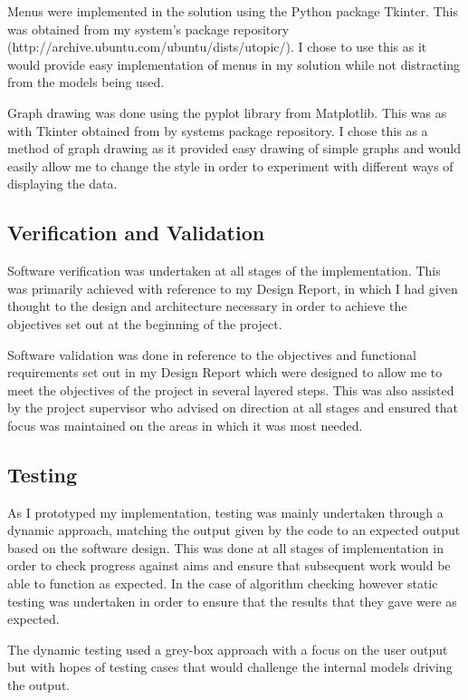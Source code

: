 \documentclass[12pt,a4paper]{article}
\begin{document}
Menus were implemented in the solution using the Python package Tkinter. This was obtained from my system's package repository (http://archive.ubuntu.com/ubuntu/dists/utopic/). I chose to use this as it would provide easy implementation of menus in my solution while not distracting from the models being used.

Graph drawing was done using the pyplot library from Matplotlib. This was as with Tkinter obtained from by systems package repository. I chose this as a method of graph drawing as it provided easy drawing of simple graphs and would easily allow me to change the style in order to experiment with different ways of displaying the data.

\subsection{Verification and Validation}
\noindent
Software verification was undertaken at all stages of the implementation. This was primarily achieved with reference to my Design Report, in which I had given thought to the design and architecture necessary in order to achieve the objectives set out at the beginning of the project.

Software validation was done in reference to the objectives and functional requirements set out in my Design Report which were designed to allow me to meet the objectives of the project in several layered steps. This was also assisted by the project supervisor who advised on direction at all stages and ensured that focus was maintained on the areas in which it was most needed.

\subsection{Testing}
\noindent
As I prototyped my implementation, testing was mainly undertaken through a dynamic approach, matching the output given by the code to an expected output based on the software design. This was done at all stages of implementation in order to check progress against aims and ensure that subsequent work would be able to function as expected. In the case of algorithm checking however static testing was undertaken in order to ensure that the results that they gave were as expected.

The dynamic testing used a grey-box approach with a focus on the user output but with hopes of testing cases that would challenge the internal models driving the output.
\end{document}
